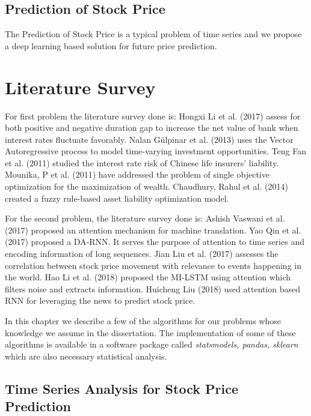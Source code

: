 	\subsection{Prediction of Stock Price}

		The Prediction of Stock Price is a typical problem of time series and we propose a deep learning based solution for future price prediction.

\section{Literature Survey}

	For first problem the literature survey done is: Hongxi Li et al. (2017) assess for both positive and negative duration gap to increase the net value of bank when interest rates fluctuate favorably\cite{}. Nalan Gülpinar et al. (2013) uses the Vector Autoregressive process to model time-varying investment opportunities\cite{}. Teng Fan et al. (2011) studied the interest rate risk of Chinese life insurers’ liability\cite{}. Mounika, P et al. (2011) have addressed the problem of single objective optimization for the maximization of wealth\cite{}. Chaudhury, Rahul et al. (2014) created a fuzzy rule-based asset liability optimization model\cite{}.

	For the second problem, the literature survey done is: Ashish Vaswani et al. (2017) proposed an attention mechanism for machine translation\cite{}. Yao Qin et al. (2017) proposed a DA-RNN. It serves the purpose of attention to time series and encoding information of long sequences\cite{}. Jian Liu et al. (2017) assesses the correlation between stock price movement with relevance to events happening in the world\cite{}. Hao Li et al. (2018) proposed the MI-LSTM using attention which filters noise and extracts information\cite{}. Huicheng Liu (2018) used attention based RNN for leveraging the news to predict stock price\cite{}.

In this chapter we describe a few of the algorithms for our problems whose knowledge we assume  in the dissertation. The implementation of some of these  algorithms is available in a software package called \emph{statsmodels, pandas, sklearn} \cite{} which are also necessary statistical analysis.



\subsection{Time Series Analysis for Stock Price Prediction}

